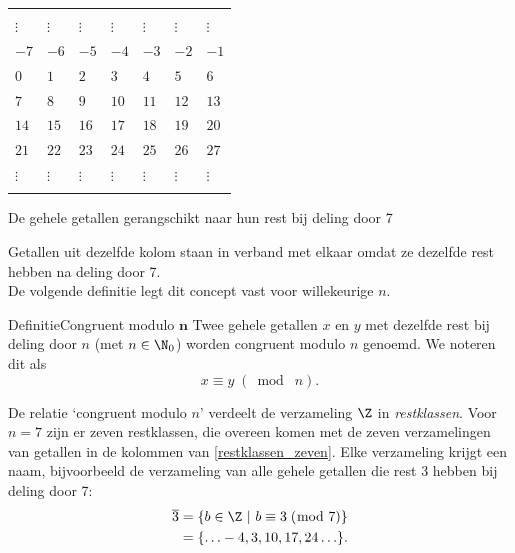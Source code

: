 \begin{multicols}{2}
	\begin{tabel}
	\begin{tabular}{C{0.87cm} C{0.87cm} C{0.87cm} C{0.87cm} C{0.87cm} C{0.87cm} C{0.87cm}}  
			\hlinethick
			 &  &  &  &  &  & \\
			\hlinethick 
			$\vdots$ & $\vdots$ & $\vdots$ & $\vdots$ & $\vdots$ & $\vdots$ & $\vdots$  \\
			$-7$ & $-6$ & $-5$ & $-4$ & $-3$ & $-2$ & $-1$  \\
			$0$ & $1$ & $2$ & $3$ & $4$ & $5$ & $6$ \\
			$7$ & $8$ & $9$ & $10$ & $11$ & $12$ & $13$ \\
			$14$ & $15$ & $16$ & $17$ & $18$ & $19$ & $20$ \\
			$21$ & $22$ & $23$ & $24$ & $25$ & $26$ & $27$ \\
			$\vdots$ & $\vdots$ & $\vdots$ & $\vdots$ & $\vdots$ & $\vdots$ & $\vdots$  \\
			\hlinethick 
	\end{tabular}
		\caption{De gehele getallen gerangschikt naar hun rest bij deling door 7}\label{restklassen_zeven}
	\end{tabel}		
	
	Getallen  uit  dezelfde kolom  staan  in  verband  met  elkaar  omdat  ze  dezelfde  rest  hebben  na  deling door 7. \\
 
 De volgende definitie legt dit concept vast voor willekeurige $n$.
	
	\begin{kader}{Definitie}{Congruent modulo $\boldsymbol{n}$}
	Twee gehele getallen $x$ en $y$ met dezelfde rest bij deling door $n$ (met $n\in \N_0$) worden congruent modulo $n$ genoemd. We noteren dit als 
	$$x\equiv y \;(\bmod\; n).$$
	\end{kader}
	
	De relatie `congruent modulo $n$' verdeelt de verzameling $\Z$ in \emph{restklassen}. Voor $n=7$ zijn er zeven restklassen, die overeen komen met de zeven verzamelingen van getallen in de kolommen van \autoref{restklassen_zeven}. Elke verzameling krijgt een naam, bijvoorbeeld de verzameling van alle gehele getallen die rest 3 hebben bij deling door 7: 
		\begin{align*}
			\overline{3}&=\{ b\in \Z \ |\ b\equiv 3 \;(\bmod\; 7)\}\\&=\{\ldots -4, 3, 10, 17, 24 \ldots \}.
		\end{align*}
	


\end{multicols}
